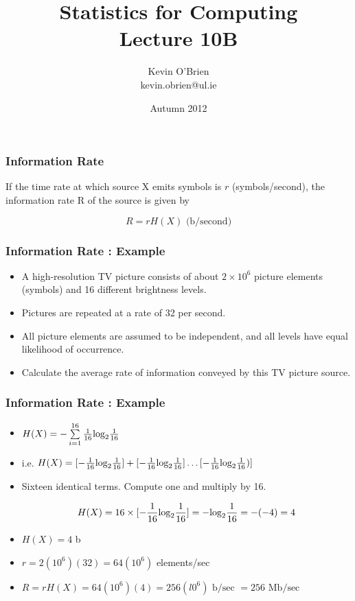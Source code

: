 \documentclass[a4]{beamer}
\title[MA4413]{Statistics for Computing \\ {\normalsize Lecture 10B}}
\author[Kevin O'Brien]{Kevin O'Brien \\ {\scriptsize kevin.obrien@ul.ie}}
\date{Autumn 2012}
\institute[Maths \& Stats]{Dept. of Mathematics \& Statistics, \\ University \textit{of} Limerick}
\begin{document}

\begin{frame}
\frametitle{Information Rate}
If the time rate at which source X emits symbols is $r$ (symbols/second), the information rate R of the
source is given by

\[R = rH(X) \mbox{      (b/second)} \]

\end{frame}


\begin{frame}
\frametitle{Information Rate : Example}
\begin{itemize}

\item A high-resolution TV picture consists of about $2 \times 10^6$ picture elements (symbols) and 16
different brightness levels. \item Pictures are repeated at a rate of 32 per second. \item All picture elements
are assumed to be independent, and all levels have equal likelihood of occurrence. \item Calculate the
average rate of information conveyed by this TV picture source.

\end{itemize}
\end{frame}

\begin{frame}
\frametitle{Information Rate : Example}
\begin{itemize}
\item $H(X) = - \sum \limits^{16}_{i=1} {1\over16} \mbox{log}_2{1\over16}$ \bigskip

\item i.e. $H(X) = [ -{1\over16} \mbox{log}_2{1\over16} ] + [- {1\over16} \mbox{log}_2{1\over16} ] \ldots [ -{1\over16} \mbox{log}_2{1\over16}) ] $ \bigskip
\item Sixteen identical terms. Compute one and multiply by 16.

\[ H(X) = 16 \times [ -{1\over16} \mbox{log}_2{1\over16} ]  = -\mbox{log}_2{1\over16} = -(-4) = 4\] \bigskip
\item $H(X)= 4$ b
\item $r =  2(10^6)(32) = 64(10^6)$ elements/sec \bigskip

\item $R = rH(X) = 64(10^6)(4) = 256(l0^6) \mbox{ b/sec } = 256 \mbox{ Mb/sec }$ \bigskip
\end{itemize}
\end{frame}
\end{document}
